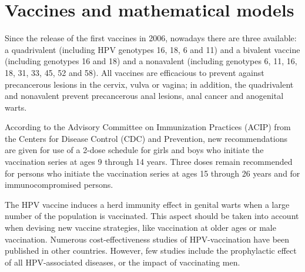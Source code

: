 \section{Vaccines and mathematical models}

Since the release of the first vaccines in 2006, nowadays there are three available: a quadrivalent (including HPV genotypes 16, 18, 6 and 11) and a bivalent vaccine (including genotypes 16 and 18) and a nonavalent (including genotypes 6, 11, 16, 18, 31, 33, 45, 52 and 58). All vaccines are efficacious to prevent against precancerous lesions in the cervix, vulva or vagina; in addition, the quadrivalent and nonavalent prevent precancerous anal lesions, anal cancer and anogenital warts. 


According to the Advisory Committee on Immunization Practices (ACIP) from the Centers for Disease Control (CDC) and Prevention, new recommendations are given for use of a 2-dose schedule for girls and boys who initiate the vaccination series at ages 9 through 14 years. Three doses remain recommended for persons who initiate the vaccination series at ages 15 through 26 years and for immunocompromised persons.

The HPV vaccine induces a herd immunity effect in genital warts when a large number of the population is vaccinated. This aspect should be taken into account when devising new vaccine strategies, like vaccination at older ages or male vaccination. Numerous cost-effectiveness studies of HPV-vaccination have been published in other countries. However, few studies include the prophylactic effect of all HPV-associated diseases, or the impact of vaccinating men.


